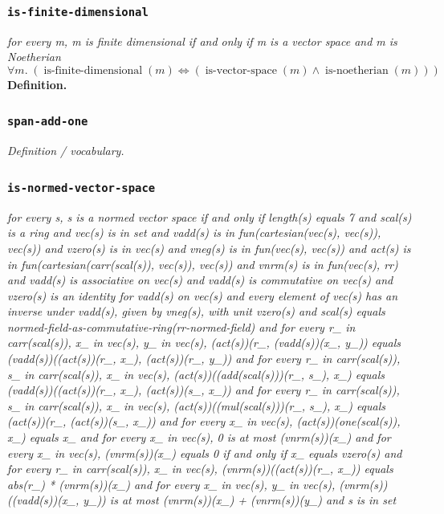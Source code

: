 \documentclass[11pt]{article}
\begin{document}
\subsubsection*{\texttt{is-finite-dimensional}}
\emph{for every m, m is finite dimensional if and only if m is a vector space and m is Noetherian}
{\small\[
\forall m.\; (\operatorname{is\text{-}finite\text{-}dimensional}(m) \Leftrightarrow (\operatorname{is\text{-}vector\text{-}space}(m) \wedge \operatorname{is\text{-}noetherian}(m)))
\]}
\noindent\textbf{Definition.}

\subsubsection*{\texttt{span-add-one}}
\emph{Definition / vocabulary.}

\subsubsection*{\texttt{is-normed-vector-space}}
\emph{for every s, s is a normed vector space if and only if length(s) equals 7 and scal(s) is a ring and vec(s) is in set and vadd(s) is in fun(cartesian(vec(s), vec(s)), vec(s)) and vzero(s) is in vec(s) and vneg(s) is in fun(vec(s), vec(s)) and act(s) is in fun(cartesian(carr(scal(s)), vec(s)), vec(s)) and vnrm(s) is in fun(vec(s), rr) and vadd(s) is associative on vec(s) and vadd(s) is commutative on vec(s) and vzero(s) is an identity for vadd(s) on vec(s) and every element of vec(s) has an inverse under vadd(s), given by vneg(s), with unit vzero(s) and scal(s) equals normed-field-as-commutative-ring(rr-normed-field) and for every r\_ in carr(scal(s)), x\_ in vec(s), y\_ in vec(s), (act(s))(r\_, (vadd(s))(x\_, y\_)) equals (vadd(s))((act(s))(r\_, x\_), (act(s))(r\_, y\_)) and for every r\_ in carr(scal(s)), s\_ in carr(scal(s)), x\_ in vec(s), (act(s))((add(scal(s)))(r\_, s\_), x\_) equals (vadd(s))((act(s))(r\_, x\_), (act(s))(s\_, x\_)) and for every r\_ in carr(scal(s)), s\_ in carr(scal(s)), x\_ in vec(s), (act(s))((mul(scal(s)))(r\_, s\_), x\_) equals (act(s))(r\_, (act(s))(s\_, x\_)) and for every x\_ in vec(s), (act(s))(one(scal(s)), x\_) equals x\_ and for every x\_ in vec(s), 0 is at most (vnrm(s))(x\_) and for every x\_ in vec(s), (vnrm(s))(x\_) equals 0 if and only if x\_ equals vzero(s) and for every r\_ in carr(scal(s)), x\_ in vec(s), (vnrm(s))((act(s))(r\_, x\_)) equals abs(r\_) * (vnrm(s))(x\_) and for every x\_ in vec(s), y\_ in vec(s), (vnrm(s))((vadd(s))(x\_, y\_)) is at most (vnrm(s))(x\_) + (vnrm(s))(y\_) and s is in set}
\end{document}
